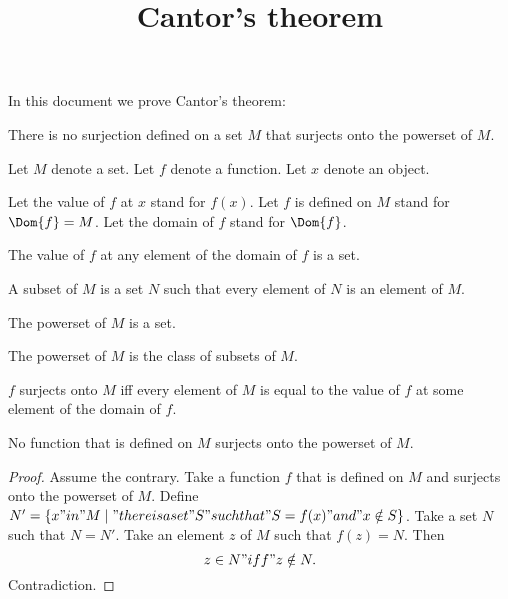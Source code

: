 \documentclass{article}
\title{Cantor's theorem}
\author{}
\date{}
\begin{document}

  \maketitle

  In this document we prove Cantor's theorem:

  \begin{quotedtheorem}
    There is no surjection defined on a set $M$ that surjects onto the powerset of $M$.
  \end{quotedtheorem}

  \begin{forthel}

    Let $M$ denote a set. Let $f$ denote a function.
    Let $x$ denote an object.

    Let the value of $f$ at $x$ stand for $f(x)$.
    Let $f$ is defined on $M$ stand for $\Dom{f} = M$.
    Let the domain of $f$ stand for $\Dom{f}$.

    \begin{axiom}
      The value of $f$ at any element of the domain of $f$ is a set.
    \end{axiom}

    \begin{definition}[Subset]
      A subset of $M$ is a set $N$ such that every element of $N$ is an element of $M$.
    \end{definition}

    \begin{signature}
      The powerset of $M$ is a set.
    \end{signature}

    \begin{axiom}
      The powerset of $M$ is the class of subsets of $M$.
    \end{axiom}

    \begin{definition}
      $f$ surjects onto $M$ iff every element of $M$ is equal to the value of $f$ at some element of the domain of $f$.
    \end{definition}

    \begin{theorem}[Cantor]
      No function that is defined on $M$ surjects onto the powerset of $M$.
    \end{theorem}
    \begin{proof}
      Assume the contrary.
      Take a function $f$ that is defined on $M$ and surjects onto the powerset of $M$.
      Define $N' = \{ x "in" M \mid "there is a set" S "such that" S = f(x) "and" x \notin S \}$.
      Take a set $N$ such that $N = N'$.
      Take an element $z$ of $M$ such that $f(z) = N$.
      Then $$z\in N "iff" z\notin N.$$
      Contradiction.
    \end{proof}

  \end{forthel}
\end{document}

